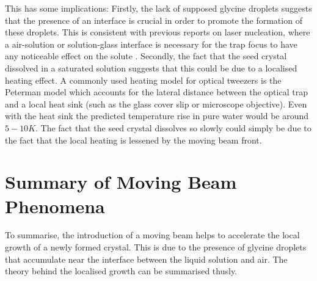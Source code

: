This has some implications: Firstly, the lack of supposed glycine 
droplets suggests that the presence of an interface is crucial in 
order to promote the formation of these droplets. This is consistent
with previous reports on laser nucleation, where a air-solution or 
solution-glass interface is necessary for the trap focus to have any 
noticeable effect on the solute \cite{Gowayed2021, Liao2022, 
Rungsimanon2010}. Secondly, the fact that the seed crystal dissolved 
in a saturated solution suggests that this could be due to a localised
heating effect. A commonly used heating model for optical tweezers is 
the Peterman model \cite{Peterman2003} which accounts for the lateral 
distance between the optical trap and a local heat sink (such as the 
glass cover slip or microscope objective). Even with the heat sink 
the predicted temperature rise in pure water would be around $5-10 K$.  
The fact that the seed crystal dissolves so slowly could simply be due 
to the fact that the local heating is lessened by the moving beam front.
 
\section{Summary of Moving Beam Phenomena}
To summarise, the introduction of a moving beam helps to accelerate the 
local growth of a newly formed crystal. This is due to the presence of 
glycine droplets that accumulate near the interface between the liquid 
solution and air. The theory behind the localised growth can be summarised 
thusly.

